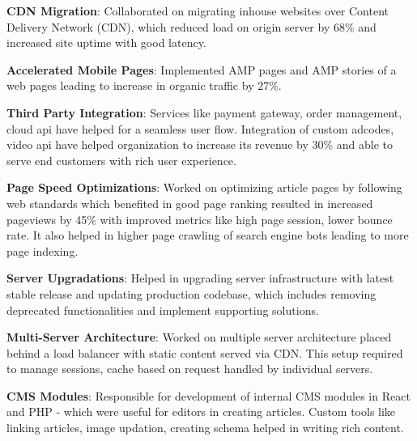 \documentclass[letterpaper,11pt]{article}
\newcommand{\resumeItem}[2]{
  \item\small{
    \textbf{#1}{: #2 \vspace{-2pt}}
  }
}
\begin{document}
        \resumeItem
        {CDN Migration}
        {Collaborated on migrating inhouse websites over Content Delivery Network (CDN), which reduced load on origin server by 68\% and increased site uptime with good latency.}
        
        \resumeItem
        {Accelerated Mobile Pages}
        {Implemented AMP pages and AMP stories of a web pages leading to increase in organic traffic by 27\%.}
        
        \resumeItem
        {Third Party Integration}
        {Services like payment gateway, order management, cloud api have helped for a seamless user flow. Integration of custom adcodes, video api have helped organization to increase its revenue by 30\% and able to serve end customers with rich user experience.}
        
        \resumeItem
        {Page Speed Optimizations}
        {Worked on optimizing article pages by following web standards which benefited in good page ranking resulted in increased pageviews by 45\% with improved metrics like high page session, lower bounce rate. It also helped in higher page crawling of search engine bots leading to more page indexing.}

        \resumeItem
        {Server Upgradations}
        {Helped in upgrading server infrastructure with latest stable release and updating production codebase, which includes removing deprecated functionalities and implement supporting solutions.}
        
        \resumeItem
        {Multi-Server Architecture}
        {Worked on multiple server architecture placed behind a load balancer with static content served via CDN. This setup required to manage sessions, cache based on request handled by individual servers. }
        
        \resumeItem
        {CMS Modules}
        {Responsible for development of internal CMS modules in React and PHP - which were useful for editors in creating articles. Custom tools like linking articles, image updation, creating schema helped in writing rich content. }
                
        
        
        
        
\end{document}
